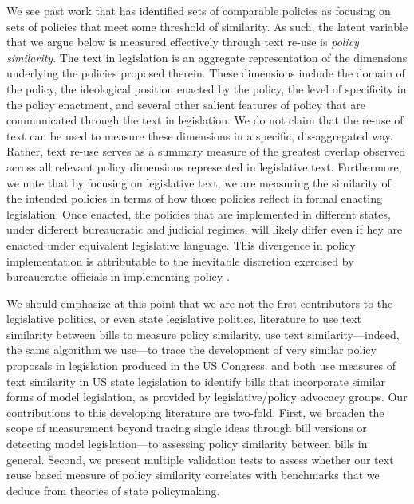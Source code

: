\documentclass[12pt]{article} %
\begin{document}
We see past work that has identified sets of comparable policies as focusing on sets of policies that meet some threshold of similarity. As such, the latent variable that we argue below is measured effectively through text re-use is {\em policy similarity}. The text in legislation is an aggregate representation of the dimensions underlying the policies proposed therein. These dimensions include the domain of the policy, the ideological position enacted by the policy, the level of specificity in the policy enactment, and several other salient features of policy that are communicated through the text in legislation. We do not claim that the re-use of text can be used to measure these dimensions in a specific, dis-aggregated way. Rather, text re-use serves as a summary measure of the greatest overlap observed across all relevant policy dimensions represented in legislative text. Furthermore, we note that by focusing on legislative text, we are measuring the similarity of the intended policies in terms of how those policies reflect in formal enacting legislation. Once enacted, the policies that are implemented in different states, under different bureaucratic and judicial regimes, will likely differ even if hey are enacted under equivalent legislative language. This divergence in policy implementation is attributable to the inevitable discretion exercised by bureaucratic officials in implementing policy \citep{weingast1983bureaucratic,scott1997assessing,gerber2005state}. 

We should emphasize at this point that we are not the first contributors to the legislative politics, or even state legislative politics, literature to use text similarity between bills to measure policy similarity. \citet{wilkerson2015tracing} use text similarity---indeed, the same algorithm we use---to trace the development of very similar policy proposals in legislation produced in the US Congress. \cite{garrett2015} and \cite{burgess2016legislative} both use measures of text similarity in US state legislation to identify bills that incorporate similar forms of model legislation, as provided by legislative/policy advocacy groups. Our contributions to this developing literature are two-fold. First, we broaden the scope of measurement beyond tracing single ideas through bill versions or detecting model legislation---to assessing policy similarity between bills in general. Second, we present multiple validation tests to assess whether our text reuse based measure of policy similarity correlates with benchmarks that we deduce from theories of state policymaking.
\end{document}
